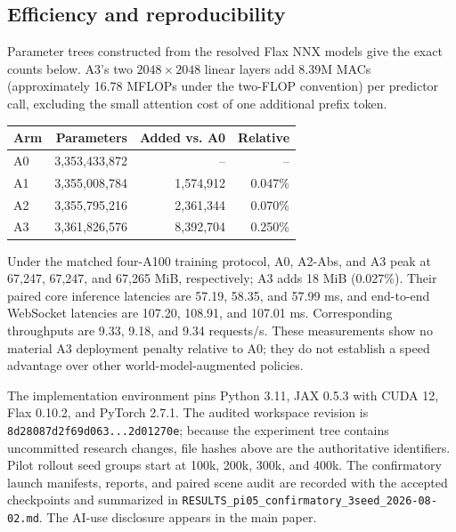 \subsection{Efficiency and reproducibility}
Parameter trees constructed from the resolved Flax NNX models give the exact
counts below.  A3's two $2048\!\times\!2048$ linear layers add 8.39M MACs
(approximately 16.78 MFLOPs under the two-FLOP convention) per predictor call,
excluding the small attention cost of one additional prefix token.
\begin{center}\small
\begin{tabular}{lrrr}
\toprule
Arm & Parameters & Added vs. A0 & Relative \\
\midrule
A0 & 3,353,433,872 & -- & -- \\
A1 & 3,355,008,784 & 1,574,912 & 0.047\% \\
A2 & 3,355,795,216 & 2,361,344 & 0.070\% \\
A3 & 3,361,826,576 & 8,392,704 & 0.250\% \\
\bottomrule
\end{tabular}
\end{center}
Under the matched four-A100 training protocol, A0, A2-Abs, and A3 peak at
67,247, 67,247, and 67,265 MiB, respectively; A3 adds 18 MiB (0.027\%).  Their
paired core inference latencies are 57.19, 58.35, and 57.99 ms, and end-to-end
WebSocket latencies are 107.20, 108.91, and 107.01 ms.  Corresponding
throughputs are 9.33, 9.18, and 9.34 requests/s.  These measurements show no
material A3 deployment penalty relative to A0; they do not establish a speed
advantage over other world-model-augmented policies.

The implementation environment pins Python 3.11, JAX 0.5.3 with CUDA 12,
Flax 0.10.2, and PyTorch 2.7.1.  The audited workspace revision is
\texttt{8d28087d2f69d063...2d01270e}; because the experiment tree contains
uncommitted research changes, file hashes above are the authoritative
identifiers.  Pilot rollout seed groups start at 100k, 200k, 300k, and 400k.
The confirmatory launch manifests, reports, and paired scene audit are recorded
with the accepted checkpoints and summarized in
\texttt{RESULTS\_pi05\_confirmatory\_3seed\_2026-08-02.md}.  The AI-use
disclosure appears in the main paper.
